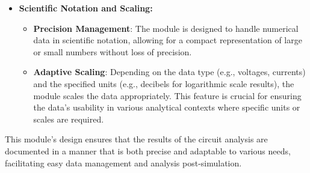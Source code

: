 \documentclass[conference]{IEEEtran}
\begin{document}
\begin{itemize}
  \item \textbf{Scientific Notation and Scaling:}
        \begin{itemize}
          \item \textbf{Precision Management}: The module is designed to handle numerical data in scientific notation, allowing for a 
          compact representation of large or small numbers without loss of precision.
          \item \textbf{Adaptive Scaling}: Depending on the data type (e.g., voltages, currents) and the specified units (e.g., decibels 
          for logarithmic scale results), the module scales the data appropriately. This feature is crucial for ensuring the data's 
          usability in various analytical contexts where specific units or scales are required.
        \end{itemize}
\end{itemize}

This module's design ensures that the results of the circuit analysis are documented in a manner that is both precise and adaptable to 
various needs, facilitating easy data management and analysis post-simulation.
\end{document}
